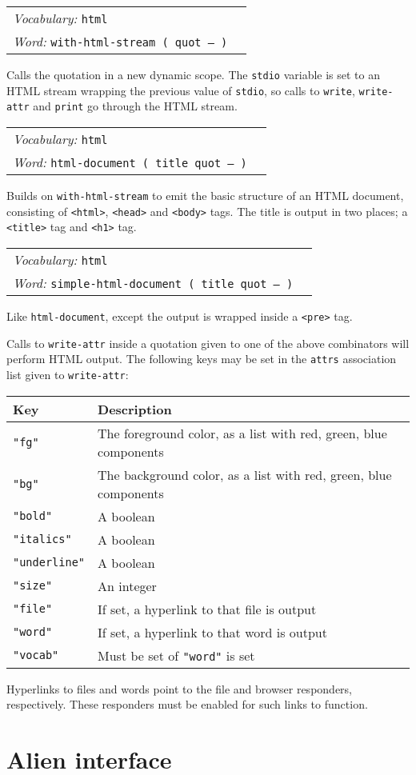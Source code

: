 \documentclass{book}
\newcommand{\vocabulary}[1]{\emph{Vocabulary:} \texttt{#1}&\\}
\newcommand{\ordinaryword}[2]{\index{\texttt{#1}}\emph{Word:} \texttt{#2}&\\}
\newcommand{\wordtable}[1]{

\begin{tabularx}{12cm}[t]{lX}
\hline
#1
\hline
\end{tabularx}

}
\begin{document}
\wordtable{
\vocabulary{html}
\ordinaryword{with-html-stream}{with-html-stream ( quot -- )}
}
Calls the quotation in a new dynamic scope. The \texttt{stdio} variable is set to an HTML stream wrapping the previous value of \texttt{stdio}, so calls to \texttt{write}, \texttt{write-attr} and \texttt{print} go through the HTML stream.

\wordtable{
\vocabulary{html}
\ordinaryword{html-document}{html-document ( title quot -- )}
}
Builds on \texttt{with-html-stream} to emit the basic structure of an HTML document, consisting of \texttt{<html>}, \texttt{<head>} and \texttt{<body>} tags. The title is output in two places; a \texttt{<title>} tag  and \texttt{<h1>} tag.

\wordtable{
\vocabulary{html}
\ordinaryword{simple-html-document}{simple-html-document ( title quot -- )}
}
Like \texttt{html-document}, except the output is wrapped inside a \texttt{<pre>} tag.

Calls to \texttt{write-attr} inside a quotation given to one of the above combinators will perform HTML output. The following keys may be set in the \texttt{attrs} association list given to \texttt{write-attr}:

\begin{tabular}{l|l}
Key&Description\\
\hline
\texttt{"fg"}&The foreground color, as a list with red, green, blue components\\
\texttt{"bg"}&The background color, as a list with red, green, blue components\\
\texttt{"bold"}&A boolean\\
\texttt{"italics"}&A boolean\\
\texttt{"underline"}&A boolean\\
\texttt{"size"}&An integer\\
\texttt{"file"}&If set, a hyperlink to that file is output\\
\texttt{"word"}&If set, a hyperlink to that word is output\\
\texttt{"vocab"}&Must be set of \texttt{"word"} is set
\end{tabular}

Hyperlinks to files and words point to the file and browser responders, respectively. These responders must be enabled for such links to function.

\section{Alien interface}
\end{document}

